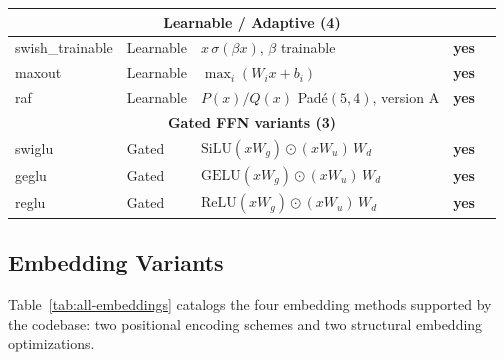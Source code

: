 \begin{longtable}{p{2.6cm}p{1.4cm}p{5.2cm}p{0.9cm}p{2.0cm}}
\multicolumn{5}{c}{\textbf{Learnable / Adaptive (4)}} \\
\midrule
swish\_trainable & Learnable & $x\,\sigma(\beta x)$, $\beta$ trainable & \textbf{yes} & \citep{ramachandran2017swish} \\
maxout & Learnable & $\max_{i}(W_i x+b_i)$ & \textbf{yes} & \citep{goodfellow2013maxout} \\
raf & Learnable & $P(x)/Q(x)$ Padé$(5,4)$, version A & \textbf{yes} & \citep{fang2023raft} \\
\midrule

\multicolumn{5}{c}{\textbf{Gated FFN variants (3)}} \\
\midrule
swiglu & Gated & $\text{SiLU}(xW_g)\odot(xW_u)\,W_d$ & \textbf{yes} & \citep{shazeer2020glu} \\
geglu & Gated & $\text{GELU}(xW_g)\odot(xW_u)\,W_d$ & \textbf{yes} & \citep{shazeer2020glu} \\
reglu & Gated & $\text{ReLU}(xW_g)\odot(xW_u)\,W_d$ & \textbf{yes} & \citep{shazeer2020glu} \\
\bottomrule
\end{longtable}
\normalsize

\subsection{Embedding Variants}

Table~\ref{tab:all-embeddings} catalogs the four embedding methods supported by the codebase: two positional encoding schemes and two structural embedding optimizations.

